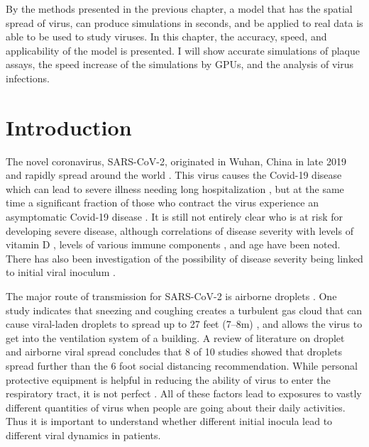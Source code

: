 
By the methods presented in the previous chapter, a model that has the spatial spread of virus, can produce simulations in seconds, and be applied to real data is able to be used to study viruses. In this chapter, the accuracy, speed, and applicability of the model is presented. I will show accurate simulations of plaque assays, the speed increase of the simulations by GPUs, and the analysis of virus infections.

\section{Introduction}

The novel coronavirus, SARS-CoV-2, originated in Wuhan, China in late 2019 and rapidly spread around the world \citep{chen20,wu20}. This virus causes the Covid-19 disease which can lead to severe illness needing long hospitalization \citep{sun20,goyal20,jiang20}, but at the same time a significant fraction of those who contract the virus experience an asymptomatic Covid-19 disease \citep{he20}. It is still not entirely clear who is at risk for developing severe disease, although correlations of disease severity with levels of vitamin D \citep{ilie20}, levels of various immune components \citep{liu20imm,liu20imm2,zhang20imm,yang20imm}, and age \citep{borghesi20,zhang20imm} have been noted. There has also been investigation of the possibility of disease severity being linked to initial viral inoculum \citep{little20, guallar20, ghandi20}.

The major route of transmission for SARS-CoV-2 is airborne droplets \citep{morawska20}. One study indicates that sneezing and coughing creates a turbulent gas cloud that can cause viral-laden droplets to spread up to 27 feet (\numrange[range-phrase = --]{7}{8}\si{\meter}) \citep{bourouiba20}, and allows the virus to get into the ventilation system of a building. A review of literature on droplet and airborne viral spread concludes that 8 of 10 studies showed that droplets spread further than the 6 foot \citep{bahl20} social distancing recommendation. While personal protective equipment is helpful in reducing the ability of virus to enter the respiratory tract, it is not perfect \citep{mittal20}. All of these factors lead to exposures to vastly different quantities of virus when people are going about their daily activities. Thus it is important to understand whether different initial inocula lead to different viral dynamics in patients. 

